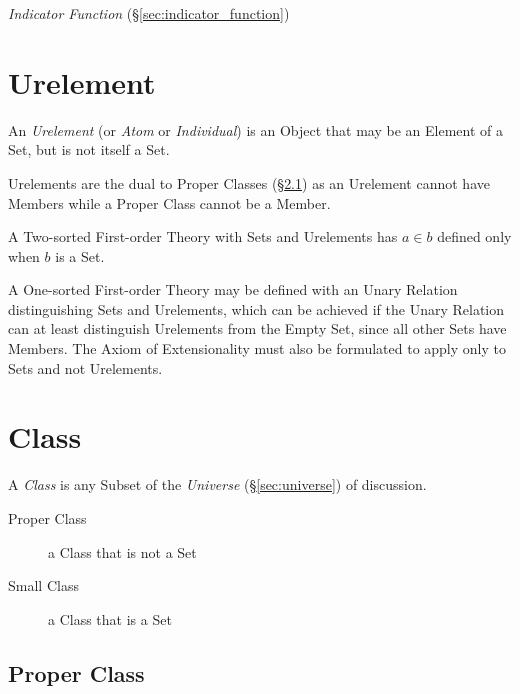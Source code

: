 \emph{Indicator Function} (\S\ref{sec:indicator_function})



\section{Urelement}\label{sec:urelement}

An \emph{Urelement} (or \emph{Atom} or \emph{Individual}) is an Object
that may be an Element of a Set, but is not itself a Set.

Urelements are the dual to Proper Classes (\S\ref{sec:proper_class})
as an Urelement cannot have Members while a Proper Class cannot be a
Member.

A Two-sorted First-order Theory with Sets and Urelements has $a \in b$
defined only when $b$ is a Set.

A One-sorted First-order Theory may be defined with an Unary Relation
distinguishing Sets and Urelements, which can be achieved if the Unary
Relation can at least distinguish Urelements from the Empty Set, since
all other Sets have Members. The Axiom of Extensionality must also be
formulated to apply only to Sets and not Urelements.



\section{Class}\label{sec:class}

A \emph{Class} is any Subset of the \emph{Universe}
(\S\ref{sec:universe}) of discussion.

\begin{description}
  \item [Proper Class] a Class that is not a Set
  \item [Small Class] a Class that is a Set
\end{description}



\subsection{Proper Class}\label{sec:proper_class}

